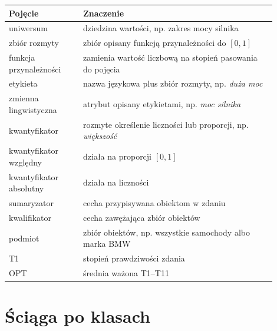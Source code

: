 \documentclass[11pt,a4paper]{article}
\begin{document}
\begin{longtable}{p{0.25\linewidth}p{0.65\linewidth}}
\toprule
\textbf{Pojęcie} & \textbf{Znaczenie}\\
\midrule
\endhead
uniwersum & dziedzina wartości, np. zakres mocy silnika\\
zbiór rozmyty & zbiór opisany funkcją przynależności do \([0,1]\)\\
funkcja przynależności & zamienia wartość liczbową na stopień pasowania do pojęcia\\
etykieta & nazwa językowa plus zbiór rozmyty, np. \emph{duża moc}\\
zmienna lingwistyczna & atrybut opisany etykietami, np. \emph{moc silnika}\\
kwantyfikator & rozmyte określenie liczności lub proporcji, np. \emph{większość}\\
kwantyfikator względny & działa na proporcji \([0,1]\)\\
kwantyfikator absolutny & działa na liczności\\
sumaryzator & cecha przypisywana obiektom w zdaniu\\
kwalifikator & cecha zawężająca zbiór obiektów\\
podmiot & zbiór obiektów, np. wszystkie samochody albo marka BMW\\
T1 & stopień prawdziwości zdania\\
OPT & średnia ważona T1--T11\\
\bottomrule
\end{longtable}

\section{Ściąga po klasach}
\end{document}

